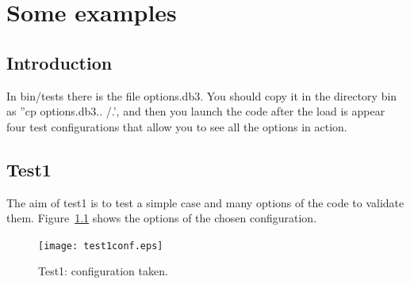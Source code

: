 \chapter{Some examples}\label{chaptest}

\minitoc

\section{Introduction}

In bin/tests there is the file options.db3. You should copy it in the
directory bin as ''cp options.db3.. /.', and then you launch the code
after the load is appear four test configurations that allow you to
see all the options in action.


\section{Test1}

The aim of test1 is to test a simple case and many options of the code
to validate them. Figure~\ref{test1conf} shows the options of the
chosen configuration.


\begin{figure}[H]
\begin{center}
  \texttt{[image: test1conf.eps]}
\end{center}
\caption{Test1: configuration taken.}
\label{test1conf}
\end{figure}

